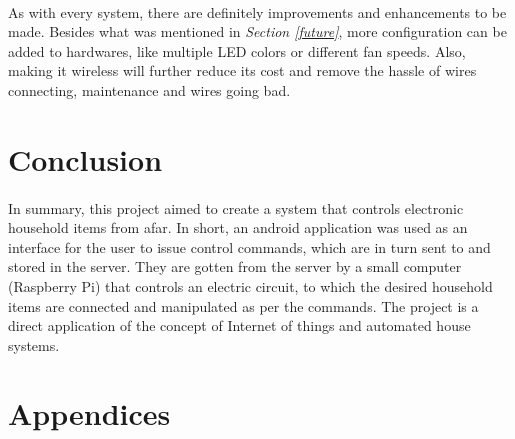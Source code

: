 \documentclass[12pt]{paper}
\begin{document}
		\paragraph{} As with every system, there are definitely improvements and enhancements to be made. Besides what was mentioned in \textit{Section \ref{future}}, more configuration can be added to hardwares, like multiple LED colors or different fan speeds. Also, making it wireless will further reduce its cost and remove the hassle of wires connecting, maintenance and wires going bad. 
		
		\section{Conclusion}
		\paragraph{}In summary, this project aimed to create a system that controls electronic household items from afar. In short, an android application was used as an interface for the user to issue control commands, which are in turn sent to and stored in the server. They are gotten from the server by a small computer (Raspberry Pi) that controls an electric circuit, to which the desired household items are connected and manipulated as per the commands. The project is a direct application of the concept of Internet of things and automated house systems.
		
		
		
		
		
		
		
		\clearpage
		\section*{Appendices}
		\appendix
\end{document}
